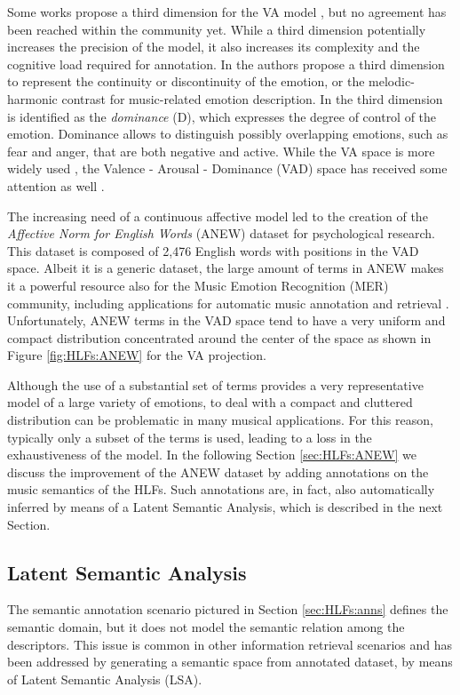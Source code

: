 Some works propose a third dimension for the VA model \cite{Kim2010}, but no agreement has been reached within the community yet. While a third dimension potentially increases the precision of the model, it also increases its complexity and the cognitive load required for annotation. In \cite{bigand2005multidimensional} the authors propose a third dimension to represent the continuity or discontinuity of the emotion, or the melodic-harmonic contrast for music-related emotion description. In \cite{scherer2004emotions} the third dimension is identified as the \textit{dominance} (D), which expresses the degree of control of the emotion. Dominance allows to distinguish possibly overlapping emotions, such as fear and anger, that are both negative and active. While the VA space is more widely used \cite{Weninger2014, aljanaki2015emotion}, the Valence - Arousal - Dominance (VAD) space has received some attention as well \cite{Yang2012, Cowie2012, Scherer2004}. 

The increasing need of a continuous affective model led to the creation of the \textit{Affective Norm for English Words} (ANEW) dataset \cite{Bradley1999} for psychological research. This dataset is composed of 2,476 English words with positions in the VAD space. Albeit it is a generic dataset, the large amount of terms in ANEW makes it a powerful resource also for the Music Emotion Recognition (MER) community, including applications for automatic music annotation and retrieval \cite{Buccoli2013, Saari2015}. Unfortunately, ANEW terms in the VAD space tend to have a very uniform and compact distribution concentrated around the center of the space as shown in Figure \ref{fig:HLFs:ANEW} for the VA projection. 

Although the use of a substantial set of terms provides a very representative model of a large variety of emotions, to deal with a compact and cluttered distribution can be problematic in many musical applications. For this reason, typically only a subset of the terms is used, leading to a loss in the exhaustiveness of the model. In the following Section \ref{sec:HLFs:ANEW} we discuss the improvement of the ANEW dataset by adding annotations on the music semantics of the HLFs. Such annotations are, in fact, also automatically inferred by means of a Latent Semantic Analysis, which is described in the next Section.

\subsection{Latent Semantic Analysis}\label{sec:HLFs:LSA}
The semantic annotation scenario pictured in Section \ref{sec:HLFs:anns} defines the semantic domain, but it does not model the semantic relation among the descriptors. This issue is common in other information retrieval scenarios and has been addressed by generating a semantic space from annotated dataset, by means of Latent Semantic Analysis (LSA).

